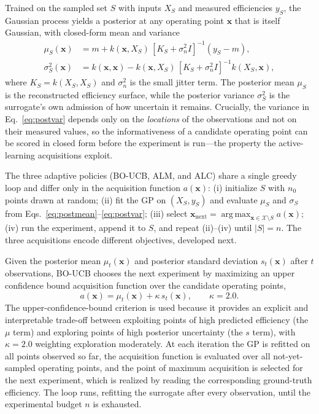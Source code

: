 \documentclass[preprint,12pt]{elsarticle}
\DeclareMathOperator*{\argmax}{arg\,max}
\begin{document}
Trained on the sampled set $S$ with inputs $X_S$ and measured efficiencies $y_S$,
the Gaussian process yields a posterior at any operating point $\mathbf{x}$ that is
itself Gaussian, with closed-form mean and variance
\begin{align}
\mu_S(\mathbf{x}) &= m + k(\mathbf{x}, X_S)\,[K_S + \sigma_n^2 I]^{-1}(y_S - m),
\label{eq:postmean}\\
\sigma_S^2(\mathbf{x}) &= k(\mathbf{x}, \mathbf{x}) - k(\mathbf{x}, X_S)\,
[K_S + \sigma_n^2 I]^{-1} k(X_S, \mathbf{x}),
\label{eq:postvar}
\end{align}
where $K_S = k(X_S, X_S)$ and $\sigma_n^2$ is the small jitter term. The posterior
mean $\mu_S$ is the reconstructed efficiency surface, while the posterior variance
$\sigma_S^2$ is the surrogate's own admission of how uncertain it remains. Crucially,
the variance in Eq.~\eqref{eq:postvar} depends only on the \emph{locations} of the
observations and not on their measured values, so the informativeness of a candidate
operating point can be scored in closed form before the experiment is run---the
property the active-learning acquisitions exploit.

The three adaptive policies (BO-UCB, ALM, and ALC) share a single greedy loop and
differ only in the acquisition function $a(\mathbf{x})$: (i) initialize $S$ with $n_0$
points drawn at random; (ii) fit the GP on $(X_S, y_S)$ and evaluate $\mu_S$ and
$\sigma_S$ from Eqs.~\eqref{eq:postmean}--\eqref{eq:postvar}; (iii) select
$\mathbf{x}_{\text{next}} = \argmax_{\mathbf{x} \in \mathcal{X}\setminus S}
a(\mathbf{x})$; (iv) run the experiment, append it to $S$, and repeat (ii)--(iv) until
$|S| = n$. The three acquisitions encode different objectives, developed next.

Given the posterior mean $\mu_t(\mathbf{x})$ and posterior standard deviation
$s_t(\mathbf{x})$ after $t$ observations, BO-UCB chooses the next experiment by
maximizing an upper confidence bound acquisition function over the candidate
operating points,
\begin{equation}
a(\mathbf{x}) = \mu_t(\mathbf{x}) + \kappa\, s_t(\mathbf{x}), \qquad \kappa = 2.0.
\label{eq:ucb}
\end{equation}
The upper-confidence-bound criterion is used because it provides an explicit and
interpretable trade-off between exploiting points of high predicted efficiency (the
$\mu$ term) and exploring points of high posterior uncertainty (the $s$ term), with
$\kappa = 2.0$ weighting exploration moderately. At each iteration the GP is refitted
on all points observed so far, the acquisition function is evaluated over all
not-yet-sampled operating points, and the point of maximum acquisition is selected for
the next experiment, which is realized by reading the corresponding ground-truth
efficiency. The loop runs, refitting the surrogate after every observation, until the
experimental budget $n$ is exhausted.
\end{document}
